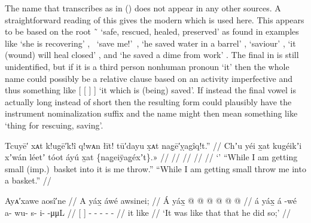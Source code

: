 The name that \citeauthor{swanton:1909} transcribes as  in (\lastx) does not appear in any other sources.
A straightforward reading of this gives the modern  which is used here.
This appears to be based on the root  \~\  ‘safe, rescued, healed, preserved’ as found in examples like  ‘she is recovering’ \parencite[107.1383]{story-naish:1973}, \ ‘save me!’\ \parencite[179.2472]{story-naish:1973},  ‘he saved water in a barrel’ \parencite[179.2474]{story-naish:1973},  ‘saviour’ \parencite[04/189]{leer:1973},  ‘it (wound) will heal closed’  \parencite[04/189]{leer:1973}, and  ‘he saved a dime from work’ \parencite[04/190]{leer:1973}.
The final  in  is still unidentified, but if it is a third person nonhuman pronoun ‘it’ then the whole name could possibly be a relative clause based on an activity imperfective and thus something like [ [ ] ] ‘it which is (being) saved’.
If instead the final vowel is actually long instead of short then the resulting form  could plausibly have the instrument nominalization suffix  and the name might then mean something like ‘thing for rescuing, saving’.

\ex\label{ex:91-72-}%
%
\begingl
	\glpreamble	Tcuyē′ xᴀt k!ugē′k!î q!wᴀn łīt! tū′dayu x̣ᴀt nag̣ē′ỵagîq!t.” //
	\glpreamble	Chʼu yéi x̱at kugéikʼi xʼwán léetʼ tóot áyú x̱at \{nag̱eiÿag̱éxʼt\}.\!» //
	\gla	 //
	\glb	 //
	\glc	 //
	\gld	 //
	\glft	‘’\newline
		“While I am getting small (imp.)\ basket into it is me throw.”\newline
		“While I am getting small throw me into a basket.”
		//
\endgl
\xe



\ex\label{ex:91-73-so-he-did}%
%
\begingl
	\glpreamble	Ayᴀ′xawe aosî′ne //
	\glpreamble	A yáx̱ áwé awsinei; //
	\gla	{} Á yáx̱ {}  @ {}
		 @ {} @ {} @ {} @ {} @ {}//
	\glb	{} á yáx̱ {} á -wé
		a- wu- s- i-  -μμL //
	\glc	{}[   {}]
		- - - -  - //
	\gld	{} it like {}
		 {} {} {} {} {} //
	\glft	‘It was like that that he did so;’
		//
\endgl
\xe

